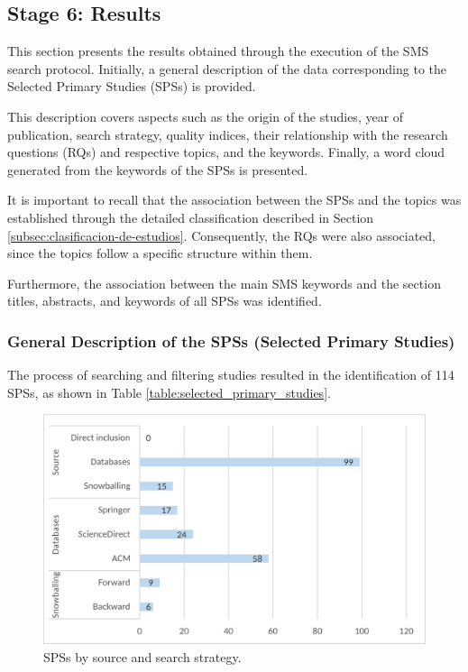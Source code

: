 \subsection{Stage 6: Results}
This section presents the results obtained through the execution of the SMS search protocol. Initially, a general description of the data corresponding to the Selected Primary Studies (SPSs) is provided.

This description covers aspects such as the origin of the studies, year of publication, search strategy, quality indices, their relationship with the research questions (RQs) and respective topics, and the keywords. Finally, a word cloud generated from the keywords of the SPSs is presented.

It is important to recall that the association between the SPSs and the topics was established through the detailed classification described in Section \ref{subsec:clasificacion-de-estudios}. Consequently, the RQs were also associated, since the topics follow a specific structure within them.

Furthermore, the association between the main SMS keywords and the section titles, abstracts, and keywords of all SPSs was identified.

\subsubsection{General Description of the SPSs (Selected Primary Studies)}
The process of searching and filtering studies resulted in the identification of 114 SPSs, as shown in Table \ref{table:selected_primary_studies}.

\begin{figure}[ht]
	\centering
	\includegraphics[scale=0.179]{resources/figures/Imagen1.eps}
	\caption{SPSs by source and search strategy.}
	\label{fig:SPSsByProcedence}
\end{figure}

